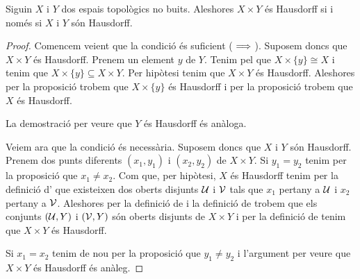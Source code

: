 \documentclass[../Apunts.tex]{subfiles}
\begin{document}
	\begin{theorem}
		\label{thm:dos espais són Hausdorff si i només si el seu producte és Hausdorff}
		Siguin \(X\) i \(Y\) dos espais topològics no buits. Aleshores \(X\times Y\) és Hausdorff si i només si \(X\) i \(Y\) són Hausdorff.
		\begin{proof}
			Comencem veient que la condició és suficient (\(\implies\)). Suposem doncs que \(X\times Y\) és Hausdorff. Prenem un element \(y\) de \(Y\). Tenim pel \corollari {} que \(X\times\{y\}\cong X\) i tenim que \(X\times\{y\}\subseteq X\times Y\). Per hipòtesi tenim que \(X\times Y\) és Hausdorff. Aleshores per la proposició  trobem que \(X\times\{y\}\) és Hausdorff i per la proposició  trobem que \(X\) és Hausdorff.
			
			La demostració per veure que \(Y\) és Hausdorff és anàloga.
			
			Veiem ara que la condició és necessària. Suposem doncs que \(X\) i \(Y\) són Hausdorff. Prenem dos punts diferents \((x_{1},y_{1})\) i \((x_{2},y_{2})\) de \(X\times Y\). Si \(y_{1}=y_{2}\) tenim per la proposició  que \(x_{1}\neq x_{2}\). Com que, per hipòtesi, \(X\) és Hausdorff tenim per la definició d' que existeixen dos oberts disjunts \(\mathcal{U}\) i \(\mathcal{V}\) tals que \(x_{1}\) pertany a \(\mathcal{U}\) i \(x_{2}\) pertany a \(\mathcal{V}\). Aleshores per la definició de  i la definició de  trobem que els conjunts \((\mathcal{U},Y)\) i \((\mathcal{V},Y)\) són oberts disjunts de \(X\times Y\) i per la definició de  tenim que \(X\times Y\) és Hausdorff.
			
			Si \(x_{1}=x_{2}\) tenim de nou per la proposició  que \(y_{1}\neq y_{2}\) i l'argument per veure que \(X\times Y\) és Hausdorff és anàleg.
		\end{proof}
	\end{theorem}
\end{document}
